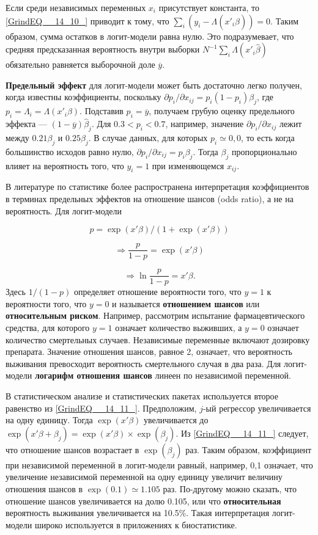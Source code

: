 Если среди независимых переменных $x_i$ присутствует константа,  то \eqref{GrindEQ__14_10_} приводит к тому, что $\sum_i(y_i- \Lambda (x'_i\widehat\beta))=0$. Таким образом,  сумма остатков в логит-модели равна нулю. Это подразумевает,  что средняя предсказанная вероятность внутри выборки $N^{-1}\sum_i \Lambda (x'_i\widehat\beta)$ обязательно равняется выборочной доле $\overline{y}$. 

\textbf{Предельный эффект} для логит-модели может быть достаточно легко получен, когда известны коэффициенты,  поскольку $\partial p_i/\partial x_{ij}=p_i\left(1-p_i\right)\beta_j$, где $p_i=\Lambda_i=\Lambda (x'_i\beta)$. 
Подставив $p_i=\overline{y}$,  получаем грубую оценку предельного эффекта --- $(1-\overline{y})\widehat\beta_j$. 
Для $0.3<p_i<0.7$, например,  значение $\partial p_i/\partial x_{ij}$ лежит между $0.21\beta_j$ и $0.25\beta_j$. В случае данных,  для которых $p_i\simeq 0,0$, то есть когда большинство исходов равно нулю,  $\partial p_i/\partial x_{ij} = p_i \beta_j$. Тогда $\beta_j$ пропорционально влияет на вероятность того,  что $y_i=1$ при изменяющемся $x_{ij}$.

В литературе по статистике более распространена интерпретация коэффициентов в терминах предельных эффектов на отношение шансов (odds ratio), а не на вероятность. Для логит-модели 

\[
p=
\exp(x'\beta )/(1+\exp(x'\beta ))
\] 

\begin{equation} 
\label{GrindEQ__14_11_} 
\Longrightarrow \frac{p}{1-p}=\exp(x'\beta ) 
\end{equation} 

\[
\Longrightarrow \ln  \frac{p}{1-p}=x'\beta.
\] 
Здесь $1/\left(1-p\right)$ определяет отношение вероятности того,  что $y=1$ к вероятности того,  что $y=0$ и называется \textbf{отношением шансов} или  \textbf{относительным риском}. Например,  рассмотрим испытание фармацевтического средства,  для которого $y=1$ означает количество выживших,  а $y=0$ означает количество смертельных случаев. Независимые переменные включают дозировку препарата. Значение отношения шансов,  равное 2,  означает,  что вероятность  выживания превосходит вероятность смертельного случая в два раза. Для логит-модели \textbf{логарифм отношения шансов} линеен по независимой переменной.

В статистическом анализе и статистических пакетах используется второе равенство из \eqref{GrindEQ__14_11_}. Предположим,  $j$-ый регрессор увеличивается на одну единицу. Тогда $\exp(x'\beta )$ увеличивается до $\exp  (x'\beta +\beta_j)=\exp(x'\beta) \times \exp(\beta_j)$. Из \eqref{GrindEQ__14_11_} следует,  что отношение шансов возрастает в $\exp (\beta_j)$ раз. Таким образом,  коэффициент при независимой переменной в логит-модели равный,  например,  0,1 означает,  что увеличение независимой переменной на одну единицу увеличит величину отношения шансов в $\exp(0.1) \simeq 1.105$ раз. По-другому можно сказать, что отношение шансов увеличивается на долю 0.105, или что \textbf{относительная} вероятность выживания увеличивается на 10.5\%. Такая интерпретация логит-модели широко используется в приложениях к биостатистике.

